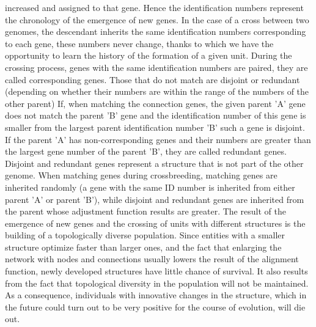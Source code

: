 increased and assigned to that gene. 
Hence the identification numbers represent the chronology of the emergence of new genes. 
In the case of a cross between two genomes, the descendant inherits the same identification numbers
corresponding to each gene, these numbers never change, thanks to which we have the opportunity 
to learn the history of the formation of a given unit. 
During the crossing process, genes with the same identification numbers are paired, 
they are called corresponding genes. 
Those that do not match are disjoint or redundant (depending on whether their numbers are 
within the range of the numbers of the other parent) 
If, when matching the connection genes, the given parent 'A' gene does not match the parent 'B' 
gene and the identification number of this gene is smaller from the largest parent identification 
number 'B' such a gene is disjoint. 
If the parent 'A' has non-corresponding genes and their numbers are greater than the largest gene 
number of the parent 'B', they are called redundant genes. 
Disjoint and redundant genes represent a structure that is not part of the other genome. 
When matching genes during crossbreeding, matching genes are inherited randomly 
(a gene with the same ID number is inherited from either parent 'A' or parent 'B'), 
while disjoint and redundant genes are inherited from the parent whose adjustment function results 
are greater. 
The result of the emergence of new genes and the crossing of units with different structures is 
the building of a topologically diverse population. Since entities with a smaller structure 
optimize faster than larger ones, and the fact that enlarging the network with nodes and 
connections usually lowers the result of the alignment function, newly developed structures have 
little chance of survival. 
It also results from the fact that topological diversity in the population will not be maintained. 
As a consequence, individuals with innovative changes in the structure, which in the future could 
turn out to be very positive for the course of evolution, will die out.

